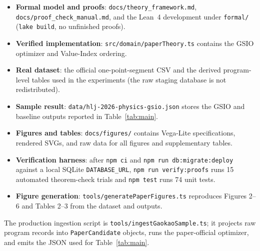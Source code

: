 \documentclass[11pt,a4paper]{article}
\begin{document}
\begin{itemize}
  \item \textbf{Formal model and proofs}: \texttt{docs/theory\_framework.md}, \texttt{docs/proof\_check\_manual.md}, and the Lean~4 development under \texttt{formal/} (\texttt{lake build}, no unfinished proofs).
  \item \textbf{Verified implementation}: \texttt{src/domain/paperTheory.ts} contains the GSIO optimizer and Value-Index ordering.
  \item \textbf{Real dataset}: the official one-point-segment CSV and the derived program-level tables used in the experiments (the raw staging database is not redistributed).
  \item \textbf{Sample result}: \texttt{data/hlj-2026-physics-gsio.json} stores the GSIO and baseline outputs reported in Table~\ref{tab:main}.
  \item \textbf{Figures and tables}: \texttt{docs/figures/} contains Vega-Lite specifications, rendered SVGs, and raw data for all figures and supplementary tables.
  \item \textbf{Verification harness}: after \texttt{npm ci} and \texttt{npm run db:migrate:deploy} against a local SQLite \texttt{DATABASE\_URL}, \texttt{npm run verify:proofs} runs 15 automated theorem-check trials and \texttt{npm test} runs 74 unit tests.
  \item \textbf{Figure generation}: \texttt{tools/generatePaperFigures.ts} reproduces Figures 2--6 and Tables 2--3 from the dataset and outputs.
\end{itemize}

The production ingestion script is \texttt{tools/ingestGaokaoSample.ts}; it projects raw program records into \texttt{PaperCandidate} objects, runs the paper-official optimizer, and emits the JSON used for Table~\ref{tab:main}.
\end{document}
